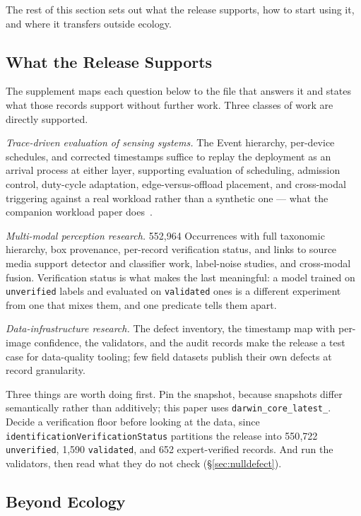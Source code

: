 \documentclass[sigconf]{acmart}
\begin{document}
The rest of this section sets out what the release supports, how to
start using it, and where it transfers outside ecology.

\subsection{What the Release Supports}

The supplement maps each question below to the file that answers it and
states what those records support without further work. Three classes
of work are directly supported.

\emph{Trace-driven evaluation of sensing systems.} The Event hierarchy,
per-device schedules, and corrected timestamps suffice to replay the
deployment as an arrival process at either layer, supporting evaluation
of scheduling, admission control, duty-cycle adaptation,
edge-versus-offload placement, and cross-modal triggering against a real
workload rather than a synthetic one --- what the companion workload
paper does~\cite{smartwilds_workload}.

\emph{Multi-modal perception research.} 552{,}964 Occurrences with full
taxonomic hierarchy, box provenance, per-record verification status, and
links to source media support detector and classifier work, label-noise
studies, and cross-modal fusion. Verification status is what makes the
last meaningful: a model trained on \texttt{unverified} labels and evaluated
on \texttt{validated} ones is a different experiment from one that mixes
them, and one predicate tells them apart.

\emph{Data-infrastructure research.} The defect inventory, the timestamp
map with per-image confidence, the validators, and the audit records
make the release a test case for data-quality tooling; few field
datasets publish their own defects at record granularity.



Three things are worth doing first. Pin the snapshot, because snapshots
differ semantically rather than additively; this paper uses
\texttt{darwin\_core\_\allowbreak latest\_}. Decide a verification floor before
looking at the data, since
\texttt{identification\allowbreak Verification\allowbreak Status} partitions the release into
550{,}722 \texttt{unverified}, 1{,}590 \texttt{validated}, and
652 expert-verified records. And run the validators, then read what
they do not check (\S\ref{sec:nulldefect}).

\subsection{Beyond Ecology}
\label{sec:beyond}
\end{document}
